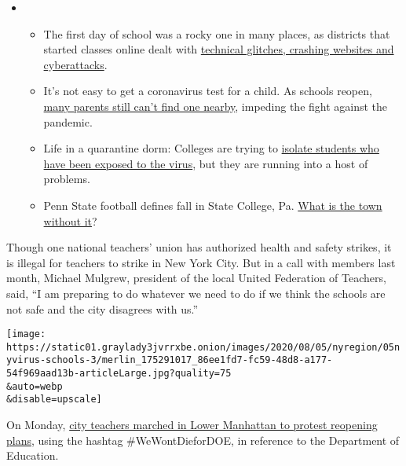 \begin{itemize}
\item
  \begin{itemize}
  \tightlist
  \item
    The first day of school was a rocky one in many places, as districts
    that started classes online dealt with
    \href{https://www.nytimes3xbfgragh.onion/2020/09/08/us/school-districts-cyberattacks-glitches.html?action=click\&pgtype=Article\&state=default\&region=MAIN_CONTENT_3\&context=storylines_keepup}{technical
    glitches, crashing websites and cyberattacks}.
  \item
    It's not easy to get a coronavirus test for a child. As schools
    reopen,
    \href{https://www.nytimes3xbfgragh.onion/2020/09/08/upshot/children-testing-shortfalls-virus.html?action=click\&pgtype=Article\&state=default\&region=MAIN_CONTENT_3\&context=storylines_keepup}{many
    parents still can't find one nearby}, impeding the fight against the
    pandemic.
  \item
    Life in a quarantine dorm: Colleges are trying to
    \href{https://www.nytimes3xbfgragh.onion/2020/09/09/business/colleges-coronavirus-dormitories-quarantine.html?action=click\&pgtype=Article\&state=default\&region=MAIN_CONTENT_3\&context=storylines_keepup}{isolate
    students who have been exposed to the virus}, but they are running
    into a host of problems.
  \item
    Penn State football defines fall in State College, Pa.
    \href{https://www.nytimes3xbfgragh.onion/2020/09/09/sports/penn-state-college-football-canceled.html?action=click\&pgtype=Article\&state=default\&region=MAIN_CONTENT_3\&context=storylines_keepup}{What
    is the town without it}?
  \end{itemize}
\end{itemize}

Though one national teachers' union has authorized health and safety
strikes, it is illegal for teachers to strike in New York City. But in a
call with members last month, Michael Mulgrew, president of the local
United Federation of Teachers, said, ``I am preparing to do whatever we
need to do if we think the schools are not safe and the city disagrees
with us.''

\texttt{[image: https://static01.graylady3jvrrxbe.onion/images/2020/08/05/nyregion/05nyvirus-schools-3/merlin\_175291017\_86ee1fd7-fc59-48d8-a177-54f969aad13b-articleLarge.jpg?quality=75\\\&auto=webp\\\&disable=upscale]}

On Monday,
\href{https://twitter.com/JoshuaPotash/status/1290476937899466752}{city
teachers marched in Lower Manhattan to protest reopening plans}, using
the hashtag \#WeWontDieforDOE, in reference to the Department of
Education.

